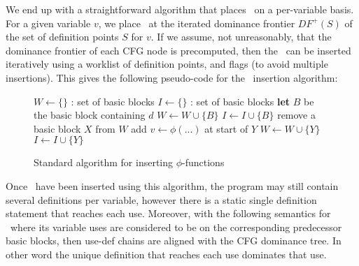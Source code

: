 {We end up with a straightforward algorithm that places \phiops\ on a per-variable basis.
For a given variable $v$, we place \phiops\ at the iterated dominance frontier $DF^{+}(S)$ of the set of definition points $S$ for $v$. 
If we assume, not unreasonably, that the dominance frontier of each CFG node is precomputed, then the \phiops\ can be inserted iteratively using a worklist of definition points, and flags (to avoid multiple insertions). 
This gives the following pseudo-code for the \phiop\ insertion algorithm:

\begin{figure}

\begin{algorithmic}[1]
\STATE $W \leftarrow \{ \}$ : set of basic blocks
\STATE $I \leftarrow \{ \}$ : set of basic blocks
    \STATE \textbf{let} $B$ be the basic block containing $d$
    \STATE $W \leftarrow W \cup \{ B \}$
    \STATE $I \leftarrow I \cup \{ B \}$
  \ENDFOR
    \STATE remove a basic block $X$ from $W$
        \STATE add $v \leftarrow \phi(...)$ at start of $Y$
          \STATE $W \leftarrow W \cup \{ Y \}$
          \STATE $I \leftarrow I \cup \{ Y \}$
        \ENDIF
      \ENDIF
    \ENDFOR
  \ENDWHILE
\ENDFOR
\end{algorithmic}
\caption{\label{fig:classical_construction:phi_insertion}Standard algorithm for inserting $\phi$-functions}
\end{figure}


Once \phiops\ have been inserted using this algorithm, the program may still contain several definitions per variable, however there is a static single definition statement that reaches each use. Moreover, with the following semantics for \phiops\ where its variable uses are considered to be on the corresponding predecessor basic blocks, then use-def chains are aligned with the CFG dominance tree. In other word the unique definition that reaches each use dominates that use.

}
